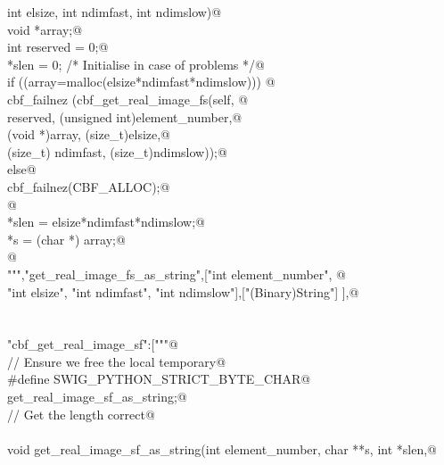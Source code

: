 \documentclass[10pt,a4paper,twoside,notitlepage]{article}
\begin{document}
\begin{flushleft}
\begin{list}{}{}
\mbox{}\verb@    int elsize, int ndimfast, int ndimslow){@\\
\mbox{}\verb@        void *array;@\\
\mbox{}\verb@        int reserved = 0;@\\
\mbox{}\verb@        *slen = 0; /* Initialise in case of problems */@\\
\mbox{}\verb@        if ((array=malloc(elsize*ndimfast*ndimslow))) {@\\
\mbox{}\verb@               cbf_failnez (cbf_get_real_image_fs(self, @\\
\mbox{}\verb@               reserved, (unsigned int)element_number,@\\
\mbox{}\verb@               (void *)array, (size_t)elsize,@\\
\mbox{}\verb@               (size_t) ndimfast, (size_t)ndimslow));@\\
\mbox{}\verb@         }else{@\\
\mbox{}\verb@               cbf_failnez(CBF_ALLOC);@\\
\mbox{}\verb@         }@\\
\mbox{}\verb@        *slen = elsize*ndimfast*ndimslow;@\\
\mbox{}\verb@        *s = (char *) array;@\\
\mbox{}\verb@      }@\\
\mbox{}\verb@""","get_real_image_fs_as_string",["int element_number", @\\
\mbox{}\verb@    "int elsize", "int ndimfast", "int ndimslow"],["(Binary)String"] ],@\\
\mbox{}\verb@@\\
\mbox{}\verb@@\\
\mbox{}\verb@"cbf_get_real_image_sf":["""@\\
\mbox{}\verb@// Ensure we free the local temporary@\\
\mbox{}\verb@%{@\\
\mbox{}\verb@#define SWIG_PYTHON_STRICT_BYTE_CHAR@\\
\mbox{}\verb@%}@\\
\mbox{}\verb@%cstring_output_allocate_size(char ** s, int *slen, free(*$1))@\\
\mbox{}\verb@       get_real_image_sf_as_string;@\\
\mbox{}\verb@// Get the length correct@\\
\mbox{}\verb@@\\
\mbox{}\verb@    void get_real_image_sf_as_string(int element_number, char **s, int *slen,@\\

\end{list}
\end{flushleft}
\end{document}
